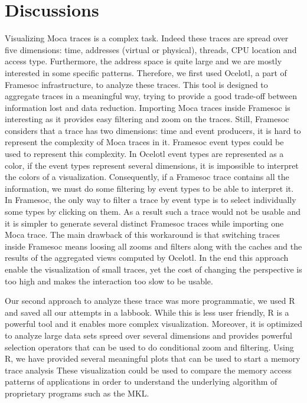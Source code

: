 \section{Discussions}
\label{sec:visu-cncl}

Visualizing \gls{Moca} traces is a complex task.
Indeed these traces are spread over five dimensions: time, addresses (virtual or physical), threads, \gls{CPU} location and access type.
Furthermore, the address space is quite large and we are mostly interested in some specific patterns.
Therefore, we first used \gls{Ocelotl}, a part of \gls{Framesoc} infrastructure, to analyze these traces.
This tool is designed to aggregate traces in a meaningful way, trying to provide a good trade-off between information lost and data reduction.
Importing \gls{Moca} traces inside \gls{Framesoc} is interesting as it provides easy filtering and zoom on the traces.
Still, \gls{Framesoc} considers that a trace has two dimensions: time and event producers, it is hard to represent the complexity of \gls{Moca} traces in it.
\gls{Framesoc} event types could be used to represent this complexity.
In \gls{Ocelotl} event types are represented as a color, if the event types represent several dimensions, it is impossible to interpret the colors of a visualization.
Consequently, if a \gls{Framesoc} trace contains all the information, we must do some filtering by event types to be able to interpret it.
In \gls{Framesoc}, the only way to filter a trace by event type is to select individually some types by clicking on them.
As a result such a trace would not be usable and it is simpler to generate several distinct \gls{Framesoc} traces while importing one \gls{Moca} trace.
The main drawback of this workaround is that switching traces inside \gls{Framesoc} means loosing all zooms and filters along with the caches and the results of the aggregated views computed by \gls{Ocelotl}.
In the end this approach enable the visualization of small traces, yet the cost of changing the perspective is too high and makes the interaction too slow to be usable.

Our second approach to analyze these trace was more programmatic, we used \gls{R} and saved all our attempts in a labbook.
While this is less user friendly, \gls{R} is a powerful tool and it enables more complex visualization.
Moreover, it is optimized to analyze large data sets spreed over several dimensions and provides powerful selection operators that can be used to do conditional zoom and filtering.
Using \gls{R}, we have provided several meaningful plots that can be used to start a memory trace analysis
These visualization could be used to compare the memory access patterns of applications in order to understand the underlying algorithm of proprietary programs such as the \gls{MKL}.

